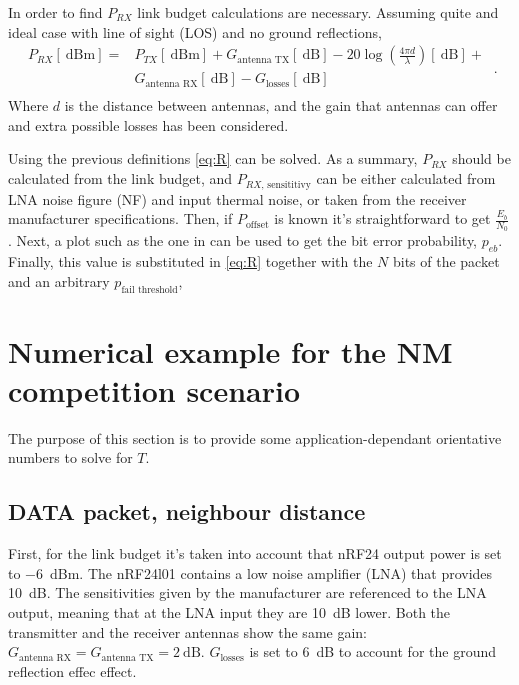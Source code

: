 In order to find $P_{RX}$ link budget calculations are necessary. Assuming quite and ideal case with line of sight (LOS) and no ground reflections,
\begin{equation}
	\begin{split}
		P_{RX} \left[ \SI{}{\dB}\text{m} \right] =& P_{TX} \left[ \SI{}{\dB}\text{m} \right] +  G_{\text{antenna TX}} \left[ \SI{}{\dB} \right]  - 20 \log\left( \frac{4 \pi d}{\lambda} \right) \left[ \SI{}{\dB} \right] +   \\
												  &   G_{\text{antenna RX}} \left[ \SI{}{\dB} \right] -  G_{\text{losses}} \left[ \SI{}{\dB} \right]  \\
	\end{split} \ .
	\label{eq:link}
\end{equation}
Where $d$ is the distance between antennas, and the gain that antennas can offer and extra possible losses has been considered.


Using the previous definitions \eqref{eq:R} can be solved. As a summary, $P_{RX}$ should be calculated from the link budget, and $P_{RX\text{, sensititivy}}$ can be either calculated from LNA noise figure (NF) and input thermal noise, or taken from the receiver manufacturer specifications. Then, if $P_{\text{offset}}$ is known it's straightforward to get $\frac{E_b}{N_0}$. Next, a plot such as the one in  can be used to get the bit error probability, $p_{eb}$. Finally, this value is substituted in \eqref{eq:R} together with the $N$ bits of the packet and an arbitrary $p_{\text{fail threshold}}$,





\section{Numerical example for the NM competition scenario}
The purpose of this section is to provide some application-dependant orientative numbers to solve for $T$.


\subsection{DATA packet, neighbour distance} \label{sub:data1}
First, for the link budget it's taken into account that nRF24 output power is set to \SI{-6}{\dB}m. The nRF24l01 contains a low noise amplifier (LNA) that provides \SI{10}{\dB}. The sensitivities given by the manufacturer are referenced to the LNA output, meaning that at the LNA input they are \SI{10}{\dB} lower. Both the transmitter and the receiver antennas show the same gain: $G_{\text{antenna RX}} = G_{\text{antenna TX}} = \SI{2}{\dB}$. $G_{\text{losses}}$ is set to \SI{6}{\dB} to account for the ground reflection effec effect.

